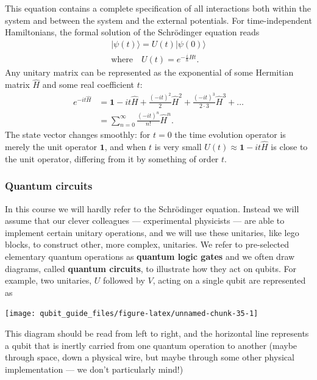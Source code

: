 \documentclass[fleqn,a4paper]{article}
\theoremstyle{definition}
\theoremstyle{definition}
\theoremstyle{definition}
\theoremstyle{definition}
\theoremstyle{remark}
\begin{document}
This equation contains a complete specification of all interactions both within the system and between the system and the external potentials.
For time-independent Hamiltonians, the formal solution of the Schrödinger equation reads
\[
  \begin{gathered}
    |\psi(t)\rangle = U(t) |\psi(0)\rangle
  \\\text{where}\quad U(t) = e^{-\frac{i}{\hbar}\hat{H}t}.
  \end{gathered}
\]
Any unitary matrix can be represented as the exponential of some Hermitian matrix \(\hat{H}\) and some real coefficient \(t\):
\[
  \begin{aligned}
    e^{-it\hat{H}}
    &= \mathbf{1}- it\hat{H} + \frac{(-it)^2}{2}\hat{H}^2 + \frac{(-it)^3}{2\cdot3}\hat{H}^3 +\ldots
  \\&= \sum_{n=0}^\infty \frac{(-it)^n}{n!}\hat{H}^n.
  \end{aligned}
\]
The state vector changes smoothly: for \(t=0\) the time evolution operator is merely the unit operator \(\mathbf{1}\), and when \(t\) is very small \(U(t)\approx \mathbf{1}-it\hat{H}\) is close to the unit operator, differing from it by something of order \(t\).

\hypertarget{quantum-circuits}{%
\subsubsection{Quantum circuits}\label{quantum-circuits}}

In this course we will hardly refer to the Schrödinger equation.
Instead we will assume that our clever colleagues --- experimental physicists --- are able to implement certain unitary operations, and we will use these unitaries, like lego blocks, to construct other, more complex, unitaries.
We refer to pre-selected elementary quantum operations as \textbf{quantum logic gates} and we often draw diagrams, called \textbf{quantum circuits}, to illustrate how they act on qubits.
For example, two unitaries, \(U\) followed by \(V\), acting on a single qubit are represented as

\begin{center}\texttt{[image: qubit\_guide\_files/figure-latex/unnamed-chunk-35-1]} \end{center}

This diagram should be read from left to right, and the horizontal line represents a qubit that is inertly carried from one quantum operation to another (maybe through space, down a physical wire, but maybe through some other physical implementation --- we don't particularly mind!)
\end{document}

